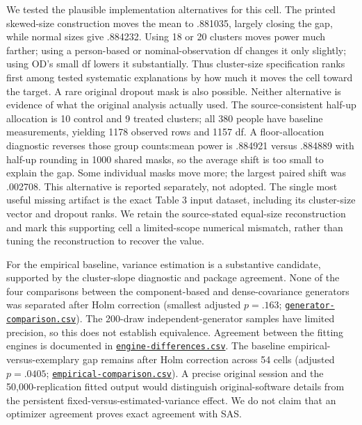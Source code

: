 \documentclass[11pt]{article}
\begin{document}
We tested the plausible implementation alternatives for this cell. The printed skewed-size construction moves the mean to .881035, largely closing the gap, while normal sizes give .884232. Using 18 or 20 clusters moves power much farther; using a person-based or nominal-observation df changes it only slightly; using OD's small df lowers it substantially. Thus cluster-size specification ranks first among tested systematic explanations by how much it moves the cell toward the target. A rare original dropout mask is also possible. Neither alternative is evidence of what the original analysis actually used. The source-consistent half-up allocation is 10 control and 9 treated clusters; all 380 people have baseline measurements, yielding 1178 observed rows and 1157 df. A floor-allocation diagnostic reverses those group counts:mean power is .884921 versus .884889 with half-up rounding in 1000 shared masks, so the average shift is too small to explain the gap. Some individual masks move more; the largest paired shift was .002708. This alternative is reported separately, not adopted. The single most useful missing artifact is the exact Table 3 input dataset, including its cluster-size vector and dropout ranks. We retain the source-stated equal-size reconstruction and mark this supporting cell a limited-scope numerical mismatch, rather than tuning the reconstruction to recover the value.

For the empirical baseline, variance estimation is a substantive candidate, supported by the cluster-slope diagnostic and package agreement. None of the four comparisons between the component-based and dense-covariance generators was separated after Holm correction (smallest adjusted $p=.163$; \href{https://github.com/alectionary/vibe-math/blob/master/formalization/kupzyk-power-assumptions/outputs/generator-comparison.csv}{\nolinkurl{generator-comparison.csv}}). The 200-draw independent-generator samples have limited precision, so this does not establish equivalence. Agreement between the fitting engines is documented in \href{https://github.com/alectionary/vibe-math/blob/master/formalization/kupzyk-power-assumptions/outputs/engine-differences.csv}{\nolinkurl{engine-differences.csv}}. The baseline empirical-versus-exemplary gap remains after Holm correction across 54 cells (adjusted $p=.0405$; \href{https://github.com/alectionary/vibe-math/blob/master/formalization/kupzyk-power-assumptions/outputs/empirical-comparison.csv}{\nolinkurl{empirical-comparison.csv}}). A precise original session and the 50,000-replication fitted output would distinguish original-software details from the persistent fixed-versus-estimated-variance effect. We do not claim that an optimizer agreement proves exact agreement with SAS.
\end{document}
